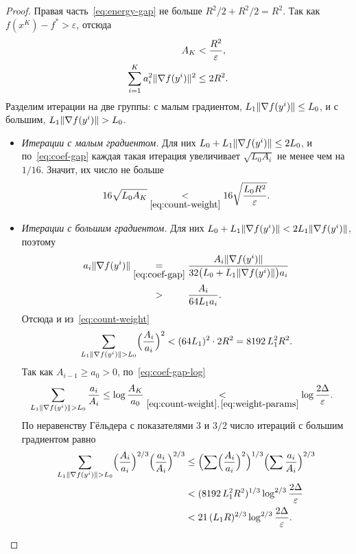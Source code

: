 \begin{proof}
Правая часть~\eqref{eq:energy-gap} не больше $R^2/2+R^2/2=R^2$. Так как $f(x^K)-f^\ast>\varepsilon$, отсюда
\begin{equation}\label{eq:count-weight}
\begin{aligned}
 A_K&<\frac{R^2}\varepsilon,\\
 \sum_{i=1}^Ka_i^2\|\nabla f(y^i)\|^2&\le2R^2 .
\end{aligned}
\end{equation}
Разделим итерации на две группы: с малым градиентом, $L_1\|\nabla f(y^i)\|\le L_0$, и с большим, $L_1\norm{\nabla f(y^i)}>L_0$.
\begin{itemize}
\item \emph{Итерации с малым градиентом.} Для них $L_0+L_1\|\nabla f(y^i)\|\le2L_0$, и по~\eqref{eq:coef-gap} каждая такая итерация увеличивает $\sqrt{L_0A_i}$ не менее чем на $1/16$. Значит, их число не больше
\[
 16\sqrt{L_0A_K}\mathrel{\underset{\eqref{eq:count-weight}}{<}}16\sqrt{\frac{L_0R^2}\varepsilon} .
\]
\item \emph{Итерации с большим градиентом.} Для них $L_0+L_1\|\nabla f(y^i)\|<2L_1\|\nabla f(y^i)\|$, поэтому
\begin{align*}
 a_i\norm{\nabla f(y^i)}&\by{=}{\eqref{eq:coef-gap}}\frac{A_i\norm{\nabla f(y^i)}}{32\bigl(L_0+L_1\norm{\nabla f(y^i)}\bigr)a_i}\\
 &\bypad{>}{}{\eqref{eq:coef-gap}}\frac{A_i}{64L_1a_i} .
\end{align*}
Отсюда и из~\eqref{eq:count-weight}
\[
 \sum_{L_1\norm{\nabla f(y^i)}>L_0}\Bigl(\frac{A_i}{a_i}\Bigr)^2<(64L_1)^2\cdot2R^2=8192\,L_1^2R^2 .
\]
Так как $A_{i-1}\ge a_0>0$, по~\eqref{eq:coef-gap-log}
\begin{align*}
 \sum_{L_1\norm{\nabla f(y^i)}>L_0}\frac{a_i}{A_i}
 &\le\log\frac{A_K}{a_0}
 \by{<}{\eqref{eq:count-weight},\,\eqref{eq:weight-params}}\log\frac{2\Delta}\varepsilon .
\end{align*}
По неравенству Гёльдера с показателями $3$ и $3/2$ число итераций с большим градиентом равно
\begin{align*}
 \sum_{L_1\norm{\nabla f(y^i)}>L_0}\Bigl(\frac{A_i}{a_i}\Bigr)^{2/3}\Bigl(\frac{a_i}{A_i}\Bigr)^{2/3}
 &\le\Bigl(\sum\Bigl(\frac{A_i}{a_i}\Bigr)^2\Bigr)^{1/3}\Bigl(\sum\frac{a_i}{A_i}\Bigr)^{2/3}\\
 &<(8192\,L_1^2R^2)^{1/3}\log^{2/3}\frac{2\Delta}\varepsilon\\
 &<21\,(L_1R)^{2/3}\log^{2/3}\frac{2\Delta}\varepsilon .\qedhere
\end{align*}
\end{itemize}
\end{proof}

